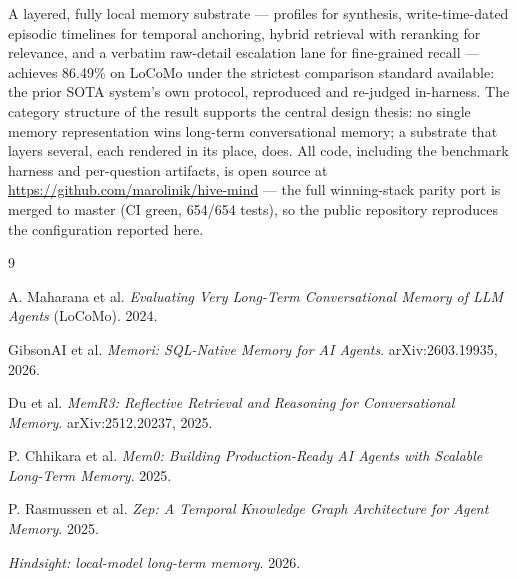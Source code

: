\documentclass[11pt]{article}
\begin{document}
A layered, fully local memory substrate --- profiles for synthesis,
write-time-dated episodic timelines for temporal anchoring, hybrid
retrieval with reranking for relevance, and a verbatim raw-detail
escalation lane for fine-grained recall --- achieves 86.49\% on LoCoMo
under the strictest comparison standard available: the prior SOTA
system's own protocol, reproduced and re-judged in-harness. The
category structure of the result supports the central design thesis:
no single memory representation wins long-term conversational memory;
a substrate that layers several, each rendered in its place, does. All
code, including the benchmark harness and per-question artifacts, is
open source at \url{https://github.com/marolinik/hive-mind} --- the
full winning-stack parity port is merged to master (CI green, 654/654
tests), so the public repository reproduces the configuration reported
here.

\begin{thebibliography}{9}

 A. Maharana et al.
\emph{Evaluating Very Long-Term Conversational Memory of LLM Agents}
(LoCoMo). 2024.

GibsonAI et al. \emph{Memori: SQL-Native Memory for AI Agents}.
arXiv:2603.19935, 2026.

 Du et al. \emph{MemR3: Reflective Retrieval and
Reasoning for Conversational Memory}. arXiv:2512.20237, 2025.

 P. Chhikara et al. \emph{Mem0: Building Production-Ready
AI Agents with Scalable Long-Term Memory}. 2025.

 P. Rasmussen et al. \emph{Zep: A Temporal Knowledge
Graph Architecture for Agent Memory}. 2025.

\emph{Hindsight: local-model long-term memory}. 2026.

\end{thebibliography}
\end{document}
